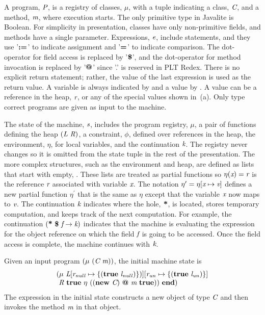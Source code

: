 A program, $\emph{P}$, is a registry of classes, $\mu$, with
a tuple indicating a class, $\emph{C}$, and a method, $\emph{m}$,
where execution starts. The only primitive type in Javalite is
Boolean. For simplicity in presentation, classes have only
non-primitive fields, and methods have a single
parameter. Expressions, $\emph{e}$, include statements, and they use
'$\textbf{:=}$' to indicate assignment and '$\textbf{=}$' to indicate
comparison.  The dot-operator for field access is replaced by
'$\textbf{\$}$', and the dot-operator for method invocation is replaced
by '$\textbf{@}$' since '.' is reserved in PLT Redex. There is no
explicit return statement; rather, the value of the last expression is
used as the return value. A variable is always indicated by 
and a value by . A value can be a reference in the heap,
$\emph{r}$, or any of the special values shown
in~(a).  Only type correct programs are given as
input to the machine.

The state of the machine, $\emph{s}$, includes the program
registry, $\mu$, a pair of functions defining the heap
$(\emph{L}\ \emph{R})$, a constraint, $\phi$, defined over
references in the heap, the environment, $\eta$, for local variables,
and the continuation $\emph{k}$. The registry never changes so it is
omitted from the state tuple in the rest of the presentation.  The
more complex structures, such as the environment and heap, are defined
as lists that start with empty, . These lists are treated as
partial functions so $\eta(\emph{x}) = \emph{r}$ is the reference
$\emph{r}$ associated with variable $\emph{x}$. The notation
$\eta^\prime = \eta[\emph{x} \mapsto \emph{v}]$ defines a new
partial function $\eta^\prime$ that is the same as $\eta$ except that
the variable $\emph{x}$ now maps to $\emph{v}$. The continuation
$\emph{k}$ indicates where the hole, $\textbf{*}$, is located, stores
temporary computation, and keeps track of the next computation. For
example, the continuation $\lp\cfgt{*}\ \cfgt{\$}\ \cfgnt{f}
\rightarrow \cfgnt{k}\rp$ indicates that the machine is evaluating the
expression for the object reference on which the field $\emph{f}$ is
going to be accessed. Once the field access is complete, the machine
continues with $\emph{k}$.


Given an input program $\lp\mu\ \lp\cfgnt{C}\ \cfgnt{m}\rp\rp$, the initial machine state is
$$
\begin{array}{l}
\lp\mu 
\ \cfgnt{L}[\cfgnt{r}_\mathit{null} \mapsto \{\lp\cfgt{true}\ \cfgnt{l}_\mathit{null})\}\rp] 
           [\cfgnt{r}_\mathit{un} \mapsto \{\lp\cfgt{true}\ \cfgnt{l}_\mathit{un}\rp\}] \\
\ \cfgnt{R}
\ \cfgt{true}\ \eta\  \lp\lp\cfgt{new}\ \cfgnt{C}\rp\ \cfgt{@}\ \cfgnt{m}\ \cfgt{true}\rp\rp\ \cfgt{end}\rp
\end{array}
$$
The expression in the initial state constructs a new object of type
$\emph{C}$ and then invokes the method $\emph{m}$ in that
object. 

